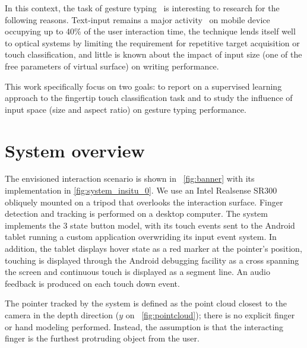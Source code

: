 \documentclass{chi-ext}
\begin{document}
In this context, the task of gesture typing~\cite{Kristensson2004} is interesting to research for the following reasons. Text-input remains a major activity~\cite{McGregor2014} on mobile device occupying up to 40\% of the user interaction time, the technique lends itself well to optical systems by limiting the requirement for repetitive target acquisition or touch classification, and little is known about the impact of input size (one of the free parameters of virtual surface) on writing performance.

This work specifically focus on two goals: to report on a supervised learning approach to the fingertip touch classification task and to study the influence of input space (size and aspect ratio) on gesture typing performance.

\section{System overview}
The envisioned interaction scenario is shown in ~\autoref{fig:banner} with its implementation in \autoref{fig:system_insitu_0}. We use an Intel Realsense SR300 obliquely mounted on a tripod that overlooks the interaction surface. Finger detection and tracking is performed on a desktop computer. The system implements the 3 state button model, with its touch events sent to the Android tablet running a custom application overwriding its input event system. In addition, the tablet displays hover state as a red marker at the pointer’s position, touching is displayed through the Android debugging facility as a cross spanning the screen and continuous touch is displayed as a segment line. An audio feedback is produced on each touch down event.

The pointer tracked by the system is defined as the point cloud closest to the camera in the depth direction ($y$ on ~\autoref{fig:pointcloud}); there is no explicit finger or hand modeling performed. Instead, the assumption is that the interacting finger is the furthest protruding object from the user.
\end{document}
